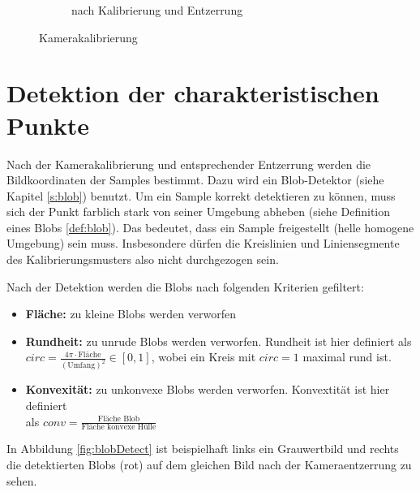 \begin{figure}[!htb]
\begin{subfigure}{.5\textwidth}
	\caption{nach Kalibrierung und Entzerrung}
	\label{fig:calibUndist}
\end{subfigure}
\caption{Kamerakalibrierung}
\label{fig:calib}
\end{figure}

\section{Detektion der charakteristischen Punkte}

Nach der Kamerakalibrierung und entsprechender Entzerrung werden die Bildkoordinaten der Samples bestimmt. Dazu wird ein Blob-Detektor (siehe Kapitel \ref{s:blob}) benutzt.
Um ein Sample korrekt detektieren zu können, muss sich der Punkt farblich stark von seiner Umgebung abheben (siehe Definition eines Blobs \ref{def:blob}). Das bedeutet, dass ein Sample freigestellt (helle homogene Umgebung) sein muss. Insbesondere dürfen die Kreislinien und Liniensegmente des Kalibrierungsmusters also nicht durchgezogen sein.

Nach der Detektion werden die Blobs nach folgenden Kriterien gefiltert:

\begin{itemize}
	\item \textbf{Fläche:} zu kleine Blobs werden verworfen
	\item \textbf{Rundheit:} zu unrude Blobs werden verworfen. Rundheit ist hier definiert als $circ = \frac{4\pi\cdot \textrm{Fläche}}{\left(\textrm{Umfang}\right)^2}\in[0,1]$, wobei ein Kreis mit $circ = 1$ maximal rund ist.
	\item  \textbf{Konvexität:} zu unkonvexe Blobs werden verworfen. Konvextität ist hier definiert \\als $conv = \frac{\textrm{Fläche Blob}}{\textrm{Fläche konvexe Hülle}}$
\end{itemize}

In Abbildung \ref{fig:blobDetect} ist beispielhaft links ein Grauwertbild und rechts die detektierten Blobs (rot) auf dem gleichen Bild nach der Kameraentzerrung zu sehen.


